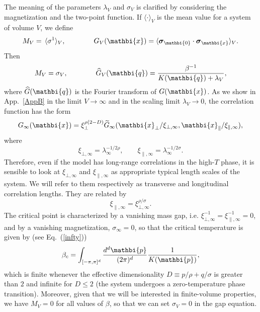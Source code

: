 \documentclass[a4paper,12pt]{article}
\def\bsigma{\mbox{\protect\boldmath $\sigma$}}
\newcommand{\reff}[1]{(\ref{#1})}
\newcommand{\pos}[1]{\mathbi{#1}}
\begin{document}
The meaning of the parameters $\lambda_V$ and $\sigma_V$ is clarified by
considering the magnetization and the two-point function.
If $\langle\cdot\rangle_V$ is the mean value for a system of volume 
$V$, we define
\begin{equation}
M_V =\, \langle \sigma^1\rangle_V, \qquad\qquad G_V(\pos{x}) = \langle 
\bsigma_\pos{0}\cdot\bsigma_\pos{x}\rangle_V.
\end{equation}
Then
\begin{equation}
M_V = \sigma_V, \qquad\qquad \widehat{G}_V(\pos{q}) = {\beta^{-1}\over 
K(\pos{q}) + \lambda_V},
\label{prop}
\end{equation}
where $\widehat{G}(\pos{q})$ is the Fourier transform of $G(\pos{x})$.
As we show in App.~\ref{AppB}
in the limit $V\to \infty$ and in the scaling limit $\lambda_V\to 0$,
the correlation function has the  form
\begin{equation}
G_\infty(\pos{x}) = \xi_\bot^{\rho(2-D)} \widetilde G_\infty 
(\pos{x}_\bot/\xi_{\bot,\infty}, \pos{x}_\|/\xi_{\|,\infty}),
\end{equation}
where
\begin{equation}
   \xi_{\bot,\infty} = \lambda_\infty^{-1/2\rho}, \qquad \xi_{\|,\infty} 
= \lambda_\infty^{-1/2\sigma}.
\end{equation}
Therefore, even if the model has long-range correlations in the high-$T$ phase,
it is sensible to look at $\xi_{\bot,\infty}$ and $\xi_{\|,\infty}$ as
appropriate typical length scales of the system. We 
will refer to them respectively as transverse and longitudinal 
correlation lengths.
They are related by 
\begin{equation}
\xi_{\|,\infty} = \xi_{\bot,\infty}^{\rho/\sigma}.
\label{xi-relation}
\end{equation}
The critical point is characterized by a vanishing mass gap,
i.e. $\xi_{\bot,\infty}^{-1}= \xi_{\|,\infty}^{-1} = 0$, 
and by a vanishing magnetization, $\sigma_\infty=0$, so that the
critical temperature is given by (see Eq.~\reff{infty})
\begin{equation}
\beta_c = \int_{[-\pi,\pi]^{d}} \frac{d^d
   \pos{p}}{(2\pi)^d} \frac{1}{K(\pos{p})},
\label{betacrit}
\end{equation}
which is finite whenever the effective dimensionality $D \equiv
p/\rho+q/\sigma$ is greater than $2$ and infinite for $D\le 2$ (the 
system undergoes a
zero-temperature phase transition).
Moreover, given that we will be interested in finite-volume properties,
we have $M_V=0$ for all values of $\beta$, so that we can set 
$\sigma_V=0$ in the gap equation.
\end{document}
